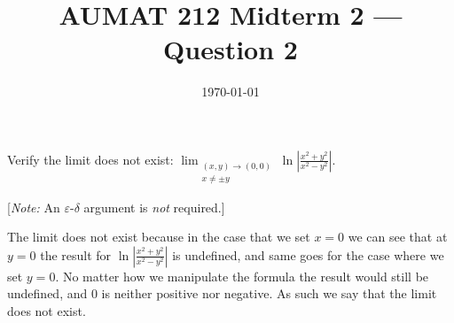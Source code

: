 \documentclass[12pt,a4paper]{article}
\title{AUMAT 212 Midterm 2 --- Question 2}
\date{\today}
\begin{document}
    \begin{problem}
        Verify the limit does not exist:
        \(\displaystyle \lim_{\substack{(x,y) \rightarrow (0,0) \\ x \neq \pm y}} \ln \left|\frac{x^2 + y^2}{x^2 - y^2} \right|\).

        [\textit{Note:} An \(\varepsilon\)-\(\delta\) argument is \emph{not} required.]
    \end{problem}
    \begin{answer}
        The limit does not exist because in the case that we set \(x = 0\) we can see that at \(y = 0\) the result for \(\ln \left|\frac{x^2 + y^2}{x^2 - y^2} \right|\) is undefined, and same goes for the case where we set \(y = 0\). No matter how we manipulate the formula the result would still be undefined, and 0 is neither positive nor negative. As such we say that the limit does not exist.
    \end{answer}
\end{document}
